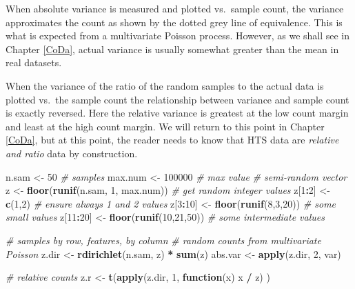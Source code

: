 \documentclass[onecolumn]{article}
\newenvironment{Shaded}{\begin{snugshade}}{\end{snugshade}}
\newcommand{\CommentTok}[1]{\textcolor[rgb]{0.56,0.35,0.01}{\textit{#1}}}
\newcommand{\ControlFlowTok}[1]{\textcolor[rgb]{0.13,0.29,0.53}{\textbf{#1}}}
\newcommand{\DecValTok}[1]{\textcolor[rgb]{0.00,0.00,0.81}{#1}}
\newcommand{\KeywordTok}[1]{\textcolor[rgb]{0.13,0.29,0.53}{\textbf{#1}}}
\newcommand{\NormalTok}[1]{#1}
\newcommand{\OperatorTok}[1]{\textcolor[rgb]{0.81,0.36,0.00}{\textbf{#1}}}
\newcommand{\StringTok}[1]{\textcolor[rgb]{0.31,0.60,0.02}{#1}}
\begin{document}
When absolute variance is measured and plotted vs.~sample count, the variance approximates the count as shown by the dotted grey line of equivalence. This is what is expected from a multivariate Poisson process. However, as we shall see in Chapter \ref{CoDa}, actual variance is usually somewhat greater than the mean in real datasets.

When the variance of the ratio of the random samples to the actual data is plotted vs.~the sample count the relationship between variance and sample count is exactly reversed. Here the relative variance is greatest at the low count margin and least at the high count margin. We will return to this point in Chapter \ref{CoDa}, but at this point, the reader needs to know that HTS data are \emph{relative and ratio} data by construction.

\begin{Shaded}
\begin{Highlighting}[]
\NormalTok{n.sam <-}\StringTok{ }\DecValTok{50} \CommentTok{# samples}
\NormalTok{max.num <-}\StringTok{ }\DecValTok{100000} \CommentTok{# max value}
\CommentTok{# semi-random vector}
\NormalTok{z <-}\StringTok{ }\KeywordTok{floor}\NormalTok{(}\KeywordTok{runif}\NormalTok{(n.sam, }\DecValTok{1}\NormalTok{, max.num)) }\CommentTok{# get random integer values}
\NormalTok{z[}\DecValTok{1}\OperatorTok{:}\DecValTok{2}\NormalTok{] <-}\StringTok{ }\KeywordTok{c}\NormalTok{(}\DecValTok{1}\NormalTok{,}\DecValTok{2}\NormalTok{) }\CommentTok{# ensure always 1 and 2 values}
\NormalTok{z[}\DecValTok{3}\OperatorTok{:}\DecValTok{10}\NormalTok{] <-}\StringTok{ }\KeywordTok{floor}\NormalTok{(}\KeywordTok{runif}\NormalTok{(}\DecValTok{8}\NormalTok{,}\DecValTok{3}\NormalTok{,}\DecValTok{20}\NormalTok{)) }\CommentTok{# some small values}
\NormalTok{z[}\DecValTok{11}\OperatorTok{:}\DecValTok{20}\NormalTok{] <-}\StringTok{ }\KeywordTok{floor}\NormalTok{(}\KeywordTok{runif}\NormalTok{(}\DecValTok{10}\NormalTok{,}\DecValTok{21}\NormalTok{,}\DecValTok{50}\NormalTok{)) }\CommentTok{# some intermediate values}

\CommentTok{# samples by row, features, by column}
\CommentTok{# random counts from multivariate Poisson}
\NormalTok{z.dir <-}\StringTok{ }\KeywordTok{rdirichlet}\NormalTok{(n.sam, z) }\OperatorTok{*}\StringTok{ }\KeywordTok{sum}\NormalTok{(z)}
\NormalTok{abs.var <-}\StringTok{ }\KeywordTok{apply}\NormalTok{(z.dir, }\DecValTok{2}\NormalTok{, var)}

\CommentTok{# relative counts}
\NormalTok{z.r <-}\StringTok{ }\KeywordTok{t}\NormalTok{(}\KeywordTok{apply}\NormalTok{(z.dir, }\DecValTok{1}\NormalTok{, }\ControlFlowTok{function}\NormalTok{(x) x }\OperatorTok{/}\StringTok{ }\NormalTok{z) )}


\end{Highlighting}
\end{Shaded}
\end{document}
